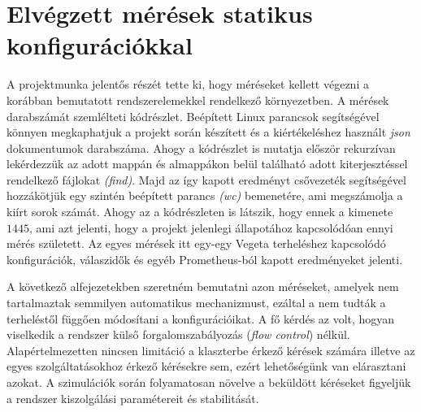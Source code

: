 \section{Elvégzett mérések statikus konfigurációkkal}
A projektmunka jelentős részét tette ki, hogy méréseket kellett végezni a korábban bemutatott rendszerelemekkel rendelkező környezetben.
A mérések darabszámát szemlélteti  kódrészlet. Beépített Linux parancsok segítségével könnyen megkaphatjuk a projekt során készített és a kiértékeléshez használt \textit{json} dokumentumok darabszáma. Ahogy a kódrészlet is mutatja először rekurzívan lekérdezzük az adott mappán és almappákon belül található adott kiterjesztéssel rendelkező fájlokat \textit{(find)}. 
Majd az így kapott eredményt csővezeték segítségével hozzákötjük egy szintén beépített parancs \textit{(wc)} bemenetére, ami megszámolja a kiírt sorok számát. 
Ahogy az a kódrészleten is látszik, hogy ennek a kimenete $1445$, ami azt jelenti, hogy a projekt jelenlegi állapotához kapcsolódóan ennyi mérés született. %
Az egyes mérések itt egy-egy Vegeta terheléshez kapcsolódó konfigurációk, válaszidők és egyéb Prometheus-ból kapott eredményeket jelenti.

\lstset{caption=Elvégzett mérések száma, label=number_of_measurements}


A következő alfejezetekben szeretném bemutatni azon méréseket, amelyek nem tartalmaztak semmilyen automatikus mechanizmust, ezáltal a nem tudták a terheléstől függően módosítani a konfigurációikat.
A fő kérdés az volt, hogyan viselkedik a rendszer külső forgalomszabályozás (\textit{flow control}) nélkül.
Alapértelmezetten nincsen limitáció a klaszterbe érkező kérések számára illetve az egyes szolgáltatásokhoz érkező kérésekre sem, ezért lehetőségünk van elárasztani azokat.
A szimulációk során folyamatosan növelve a beküldött kéréseket figyeljük a rendszer kiszolgálási paramétereit és stabilitását.


